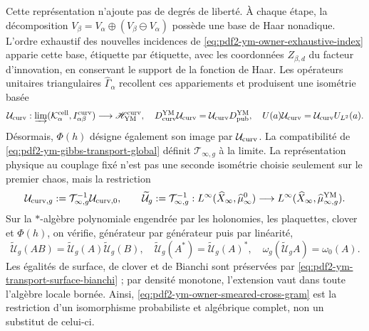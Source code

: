 Cette représentation n'ajoute pas de degrés de liberté. À chaque étape, la décomposition $V_\beta=V_\alpha\oplus(V_\beta\ominus V_\alpha)$ possède une base de Haar nonadique. L'ordre exhaustif des nouvelles incidences de \eqref{eq:pdf2-ym-owner-exhaustive-index} apparie cette base, étiquette par étiquette, avec les coordonnées $Z_{\beta,d}$ du facteur d'innovation, en conservant le support de la fonction de Haar. Les opérateurs unitaires triangulaires $\widehat\Gamma_\alpha$ recollent ces appariements et produisent une isométrie basée
\begin{equation}\label{eq:pdf2-ym-owner-publication-into-physical}
 \mathcal U_{\rm curv}:
 \varinjlim(\mathcal K_\alpha^{\rm cell},I_{\alpha\beta}^{\rm curv})
 \longrightarrow\mathscr H_{\rm YM}^{\rm curv},
 \quad
 D_{\rm curv}^{\rm YM}\mathcal U_{\rm curv}
 =\mathcal U_{\rm curv}D_{\rm pub}^{\rm YM},
 \quad U(a)\mathcal U_{\rm curv}=\mathcal U_{\rm curv}U_{L^2}(a).
\end{equation}
Désormais, $\Phi(h)$ désigne également son image par $\mathcal U_{\rm curv}$. La compatibilité de \eqref{eq:pdf2-ym-gibbs-transport-global} définit $\mathcal T_{\infty,g}$ à la limite. La représentation physique au couplage fixé n'est pas une seconde isométrie choisie seulement sur le premier chaos, mais la restriction
\begin{equation}\label{eq:pdf2-ym-full-publication-restriction}
 \mathcal U_{{\rm curv},g}
 :=\mathcal T_{\infty,g}^{-1}\mathcal U_{{\rm curv},0},
 \qquad
 \widetilde{\mathcal U}_g
 :=\mathcal T_{\infty,g}^{-1}:
 L^\infty(\widehat X_\infty,\widehat\mu_\infty^0)
 \longrightarrow
 L^\infty(\widehat X_\infty,\widehat\mu_{\infty,g}^{\rm YM}).
\end{equation}
Sur la $*$-algèbre polynomiale engendrée par les holonomies, les plaquettes, clover et
$\Phi(h)$, on vérifie, générateur par générateur puis par linéarité,
\begin{equation}\label{eq:pdf2-ym-full-publication-products}
 \widetilde{\mathcal U}_g(AB)
 =\widetilde{\mathcal U}_g(A)\widetilde{\mathcal U}_g(B),
 \quad
 \widetilde{\mathcal U}_g(A^*)=\widetilde{\mathcal U}_g(A)^*,
 \quad
 \omega_g(\widetilde{\mathcal U}_gA)=\omega_0(A).
\end{equation}
Les égalités de surface, de clover et de Bianchi sont préservées par
\eqref{eq:pdf2-ym-transport-surface-bianchi} ; par densité monotone, l’extension
vaut dans toute l’algèbre locale bornée. Ainsi,
\eqref{eq:pdf2-ym-owner-smeared-cross-gram} est la restriction d’un isomorphisme
probabiliste et algébrique complet, non un substitut de celui-ci.


